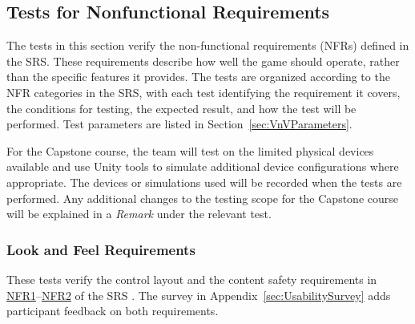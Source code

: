 \documentclass[10pt,titlepage]{article}
\newcommand{\srsurl}{https://team-hindsight.github.io/ophthamology-game/SRS/SRS.pdf}
\newcommand{\srsnfrref}[2]{\href{\srsurl\#nameddest=#1}{NFR#2}}
\begin{document}
\subsection{Tests for Nonfunctional Requirements}\label{sec:NFRSystemTests}

The tests in this section verify the non-functional requirements (NFRs)
defined in the SRS. These requirements describe how well the game
should operate, rather than the specific features it provides.
The tests are organized according to the NFR categories in the
SRS, with each test identifying the requirement it covers, the conditions
for testing, the expected result, and how the test will be performed. Test
parameters are listed in Section~\ref{sec:VnVParameters}.

For the Capstone course, the team will test on the limited physical devices
available and use Unity tools to simulate additional device configurations
where appropriate. The devices or simulations used will be recorded when
the tests are performed. Any additional changes to the testing scope for
the Capstone course will be explained in a \textit{Remark} under the
relevant test.



\subsubsection{Look and Feel Requirements}
\label{sec:LookAndFeelNFRTests}

These tests verify the control layout and the content safety requirements in
\srsnfrref{NFR_Layout}{1}--\srsnfrref{NFR_ChildSafe}{2} of the SRS
\cite{SRS}. The survey in Appendix~\ref{sec:UsabilitySurvey} adds participant
feedback on both requirements.
\end{document}
